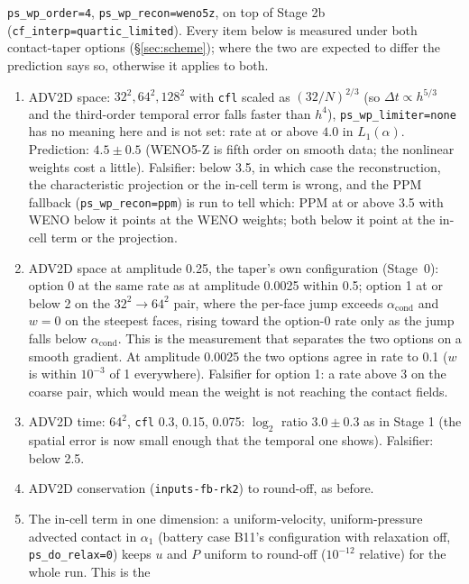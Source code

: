 \documentclass[11pt,a4paper]{article}
\newcommand{\code}[1]{\texttt{\small #1}}
\newcommand{\Dt}{\Delta t}
\begin{document}
\code{ps\_wp\_order=4}, \code{ps\_wp\_recon=weno5z}, on top of Stage 2b
(\code{cf\_interp=quartic\_limited}).  Every item below is measured under
both contact-taper options (\S\ref{sec:scheme}); where the two are
expected to differ the prediction says so, otherwise it applies to both.

\begin{enumerate}[nosep]
\item ADV2D space: $32^2, 64^2, 128^2$ with \code{cfl} scaled as
      $(32/N)^{2/3}$ (so $\Dt\propto h^{5/3}$ and the third-order temporal
      error falls faster than $h^4$), \code{ps\_wp\_limiter=none} has no
      meaning here and is not set: rate at or above $4.0$ in
      $L_1(\alpha)$.  Prediction: $4.5\pm0.5$ (WENO5-Z is fifth order on
      smooth data; the nonlinear weights cost a little).  Falsifier: below
      3.5, in which case the reconstruction, the characteristic projection
      or the in-cell term is wrong, and the PPM fallback
      (\code{ps\_wp\_recon=ppm}) is run to tell which: PPM at or above 3.5
      with WENO below it points at the WENO weights; both below it point
      at the in-cell term or the projection.
\item ADV2D space at amplitude 0.25, the taper's own configuration
      (Stage~0): option 0 at the same rate as at amplitude 0.0025 within
      0.5; option 1 at or below 2 on the $32^2 \to 64^2$ pair, where the
      per-face jump exceeds $\alpha_{\mathrm{cond}}$ and $w = 0$ on the
      steepest faces, rising toward the option-0 rate only as the jump
      falls below $\alpha_{\mathrm{cond}}$.  This is the measurement that
      separates the two options on a smooth gradient.  At amplitude
      0.0025 the two options agree in rate to 0.1 ($w$ is within
      $10^{-3}$ of 1 everywhere).  Falsifier for option 1: a rate above 3
      on the coarse pair, which would mean the weight is not reaching the
      contact fields.
\item ADV2D time: $64^2$, \code{cfl} 0.3, 0.15, 0.075: $\log_2$ ratio
      $3.0\pm0.3$ as in Stage 1 (the spatial error is now small enough
      that the temporal one shows).  Falsifier: below 2.5.
\item ADV2D conservation (\code{inputs-fb-rk2}) to round-off, as before.
\item The in-cell term in one dimension: a uniform-velocity, uniform-pressure
      advected contact in $\alpha_1$ (battery case B11's configuration with
      relaxation off, \code{ps\_do\_relax=0}) keeps $u$ and $P$ uniform to
      round-off ($10^{-12}$ relative) for the whole run.  This is the

\end{enumerate}
\end{document}

